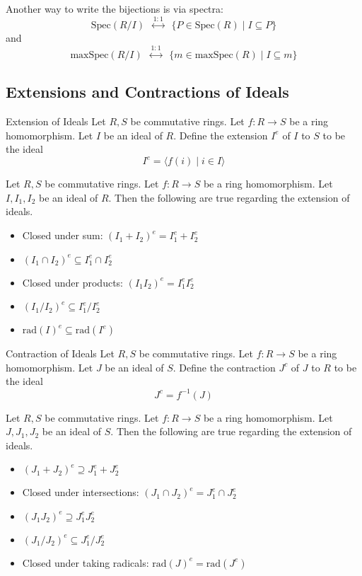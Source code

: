 \documentclass[a4paper]{article}
\begin{document}
Another way to write the bijections is via spectra: $$\text{Spec}(R/I)\;\;\overset{1:1}{\longleftrightarrow}\;\;\{P\in\text{Spec}(R)\;|\;I\subseteq P\}$$ and $$\text{maxSpec}(R/I)\;\;\overset{1:1}{\longleftrightarrow}\;\;\{m\in\text{maxSpec}(R)\;|\;I\subseteq m\}$$

\subsection{Extensions and Contractions of Ideals}
\begin{defn}{Extension of Ideals}{} Let $R,S$ be commutative rings. Let $f:R\to S$ be a ring homomorphism. Let $I$ be an ideal of $R$. Define the extension $I^e$ of $I$ to $S$ to be the ideal $$I^e=\langle f(i)\;|\;i\in I\rangle$$
\end{defn}

\begin{prp}{}{} Let $R,S$ be commutative rings. Let $f:R\to S$ be a ring homomorphism. Let $I,I_1,I_2$ be an ideal of $R$. Then the following are true regarding the extension of ideals. 
\begin{itemize}
\item Closed under sum: $(I_1+I_2)^e=I_1^e+I_2^e$
\item $(I_1\cap I_2)^e\subseteq I_1^e\cap I_2^e$
\item Closed under products: $(I_1I_2)^e=I_1^eI_2^e$
\item $(I_1/I_2)^e\subseteq I_1^e/I_2^e$
\item $\text{rad}(I)^e\subseteq\text{rad}(I^e)$
\end{itemize}
\end{prp}

\begin{defn}{Contraction of Ideals}{} Let $R,S$ be commutative rings. Let $f:R\to S$ be a ring homomorphism. Let $J$ be an ideal of $S$. Define the contraction $J^c$ of $J$ to $R$ to be the ideal $$J^c=f^{-1}(J)$$
\end{defn}

\begin{prp}{}{} Let $R,S$ be commutative rings. Let $f:R\to S$ be a ring homomorphism. Let $J,J_1,J_2$ be an ideal of $S$. Then the following are true regarding the extension of ideals. 
\begin{itemize}
\item $(J_1+J_2)^e\supseteq J_1^e+J_2^e$
\item Closed under intersections: $(J_1\cap J_2)^e=J_1^e\cap J_2^e$
\item $(J_1J_2)^e\supseteq J_1^eJ_2^e$
\item $(J_1/J_2)^e\subseteq J_1^e/J_2^e$
\item Closed under taking radicals: $\text{rad}(J)^e=\text{rad}(J^e)$
\end{itemize}
\end{prp}
\end{document}
